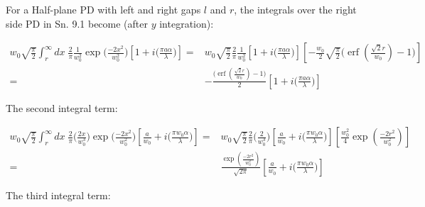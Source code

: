 \documentclass[aps,twoside,secnumarabic,balancelastpage,amsmath,amssymb,nofootinbib,hyperref=pdftex]{revtex4}
\begin{document}
For a Half-plane PD with left and right gaps $l$ and $r$, the integrals over the right side PD in Sn. 9.1 become (after $y$ integration):

\begin{align*}
w_0 \sqrt{ \frac{\pi}{2} }   \int_{r}^{\infty} dx \;
\frac{2}{\pi}
		\frac{1}{w_0^2}
		\exp \big( \frac{-2 x^2}{w_0^{2}} \big)
        \left[
				1+
				i \big( \frac{ \pi a \alpha}{ \lambda} \big)
			\right]
            =&
w_0 \sqrt{ \frac{\pi}{2} }
\frac{2}{\pi}
		\frac{1}{w_0^2}
        \left[
				1+
				i \big( \frac{ \pi a \alpha}{ \lambda} \big)
			\right] 
         \left[
         -
             \frac{w_0}{2} \sqrt{\frac{\pi}{2}} 
             \big(
             \operatorname{erf}(\frac{\sqrt{2} r}{w_0})
             -1
             \big)
         \right]
                    \\ =&
         -{ \frac{             \big(
             \operatorname{erf}(\frac{\sqrt{2} r}{w_0})
             -1
             \big)
         	}{2} }
        \left[
				1+
				i \big( \frac{ \pi a \alpha}{ \lambda} \big)
			\right] 
\end{align*}

The second integral term:

\begin{align*}
w_0 \sqrt{ \frac{\pi}{2} }   \int_{r}^{\infty} dx \;
\frac{2}{\pi}
\Big( \frac{2 x}{w_0^3} \Big)
		\exp \big( \frac{-2 x^2}{w_0^{2}} \big)	
        			\left[
			\frac{a}{w_{0}}		
			+
			i  \big( \frac{\pi w_{0} \alpha}{\lambda} \big)
			\right]
    =&
       w_0 \sqrt{ \frac{\pi}{2} } 
       \frac{2}{\pi}
        \Big( \frac{2 }{w_0^3} \Big)			
        	\left[
                \frac{a}{w_{0}}		
                +
                i  \big( \frac{\pi w_{0} \alpha}{\lambda} \big)
			\right] 
            \left[
                \frac{w_0^2}{4}
                \exp( \frac{-2r^2}{w_0^2})
            \right]
       \\ =&
       \frac{\exp( \frac{-2r^2}{w_0^2})}{\sqrt{2 \pi}}
        	\left[
                \frac{a}{w_{0}}		
                +
                i  \big( \frac{\pi w_{0} \alpha}{\lambda} \big)
			\right] 
\end{align*}

The third integral term:
\end{document}
